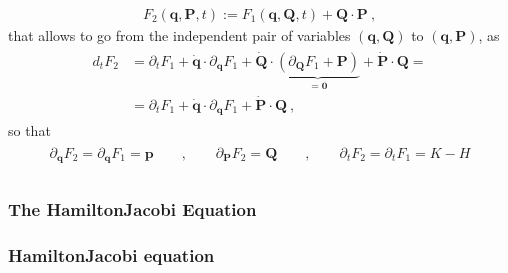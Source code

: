 \documentclass[letterpaper,10pt,english]{jupyterBook}
\begin{document}
\begin{equation*}
\begin{split}F_2(\mathbf{q}, \mathbf{P}, t) := F_1(\mathbf{q}, \mathbf{Q}, t) + \mathbf{Q} \cdot \mathbf{P} \ ,\end{split}
\end{equation*}
\sphinxAtStartPar
that allows to go from the independent pair of variables \((\mathbf{q}, \mathbf{Q})\) to \((\mathbf{q}, \mathbf{P})\), as
\begin{equation*}
\begin{split}\begin{aligned}
  d_t F_2 
  & = \partial_t F_1 + \dot{\mathbf{q}} \cdot \partial_{\mathbf{q}} F_1 + \dot{\mathbf{Q}} \cdot \underbrace{\left( \partial_{\mathbf{Q}} F_1 + \mathbf{P} \right)}_{= \mathbf{0}} + \dot{\mathbf{P}} \cdot \mathbf{Q} = \\
  & =\partial_t F_1 + \dot{\mathbf{q}} \cdot \partial_{\mathbf{q}} F_1 + \dot{\mathbf{P}} \cdot \mathbf{Q} \ ,
\end{aligned}\end{split}
\end{equation*}
\sphinxAtStartPar
so that
\begin{equation*}
\begin{split}\begin{aligned}
  \partial_{\mathbf{q}} F_2 = \partial_{\mathbf{q}} F_1 = \mathbf{p} \qquad , \qquad
  \partial_{\mathbf{P}} F_2 = \mathbf{Q} \qquad , \qquad
  \partial_t F_2 = \partial_{t} F_1 = K - H \\
\end{aligned}\end{split}
\end{equation*}

\subsubsection{The Hamilton\sphinxhyphen{}Jacobi Equation}
\label{\detokenize{ch/quantum-mechanics/atom-models/analytical-mechanics-short:the-hamilton-jacobi-equation}}\label{\detokenize{ch/quantum-mechanics/atom-models/analytical-mechanics-short:analytical-mechanics-short-hamilton-jacobi-equation}}\subsubsection*{Hamilton\sphinxhyphen{}Jacobi equation}
\end{document}

